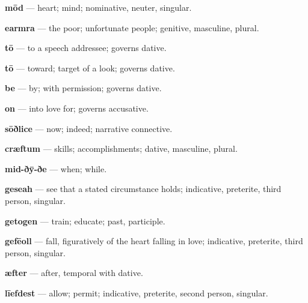 \textbf{mōd} — heart; mind; nominative, neuter, singular.

\textbf{earmra} — the poor; unfortunate people; genitive, masculine, plural.

\textbf{tō} — to a speech addressee; governs dative.

\textbf{tō} — toward; target of a look; governs dative.

\textbf{be} — by; with permission; governs dative.

\textbf{on} — into love for; governs accusative.

\textbf{sōðlice} — now; indeed; narrative connective.

\textbf{cræftum} — skills; accomplishments; dative, masculine, plural.

\textbf{mid-ðȳ-ðe} — when; while.

\textbf{geseah} — see that a stated circumstance holds; indicative, preterite, third person, singular.

\textbf{getogen} — train; educate; past, participle.

\textbf{gefēoll} — fall, figuratively of the heart falling in love; indicative, preterite, third person, singular.

\textbf{æfter} — after, temporal with dative.

\textbf{līefdest} — allow; permit; indicative, preterite, second person, singular.

